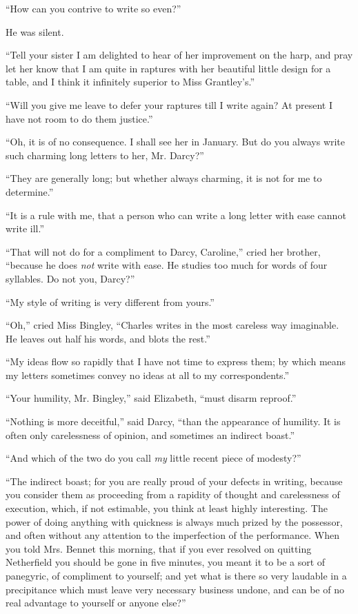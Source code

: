 \documentclass[12pt,openright]{book}
\begin{document}
“How can you contrive to write so even?”

He was silent.

“Tell your sister I am delighted to hear of her improvement on the harp, and pray let her know that I am quite in raptures with her beautiful little design for a table, and I think it infinitely superior to Miss Grantley’s.”

“Will you give me leave to defer your raptures till I write again? At present I have not room to do them justice.”

“Oh, it is of no consequence. I shall see her in January. But do you always write such charming long letters to her, Mr. Darcy?”

“They are generally long; but whether always charming, it is not for me to determine.”

“It is a rule with me, that a person who can write a long letter with ease cannot write ill.”

“That will not do for a compliment to Darcy, Caroline,” cried her brother, “because he does \textit{not} write with ease. He studies too much for words of four syllables. Do not you, Darcy?”

“My style of writing is very different from yours.”

“Oh,” cried Miss Bingley, “Charles writes in the most careless way imaginable. He leaves out half his words, and blots the rest.”

“My ideas flow so rapidly that I have not time to express them; by which means my letters sometimes convey no ideas at all to my correspondents.”

“Your humility, Mr. Bingley,” said Elizabeth, “must disarm reproof.”

“Nothing is more deceitful,” said Darcy, “than the appearance of humility. It is often only carelessness of opinion, and sometimes an indirect boast.”

“And which of the two do you call \textit{my} little recent piece of modesty?”

“The indirect boast; for you are really proud of your defects in writing, because you consider them as proceeding from a rapidity of thought and carelessness of execution, which, if not estimable, you think at least highly interesting. The power of doing anything with quickness is always much prized by the possessor, and often without any attention to the imperfection of the performance. When you told Mrs. Bennet this morning, that if you ever resolved on quitting Netherfield you should be gone in five minutes, you meant it to be a sort of panegyric, of compliment to yourself; and yet what is there so very laudable in a precipitance which must leave very necessary business undone, and can be of no real advantage to yourself or anyone else?”
\end{document}
